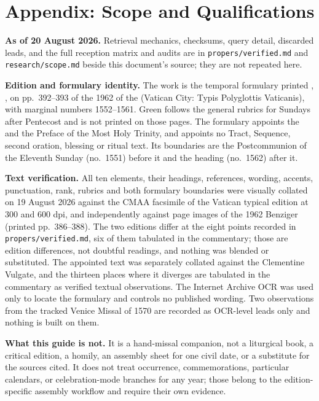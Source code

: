 \sectionguard
\section*{Appendix: Scope and Qualifications}

\textbf{As of 20 August 2026.} Retrieval mechanics, checksums, query detail,
discarded leads, and the full reception matrix and audits are in
\texttt{propers/verified.md} and \texttt{research/scope.md} beside this
document's source; they are not repeated here.

\editionnote

\textbf{Edition and formulary identity.} The work is the temporal formulary
printed , , on
pp.\ 392--393 of the 1962  of the  (Vatican City: Typis Polyglottis Vaticanis), with marginal numbers
1552--1561. Green follows the general rubrics for Sundays after Pentecost and
is not printed on those pages. The formulary appoints the  and
the Preface of the Most Holy Trinity, and appoints no Tract, Sequence, second
oration, blessing or ritual text. Its boundaries are the Postcommunion of the
Eleventh Sunday (no.\ 1551) before it and the heading  (no.\ 1562) after it.

\textbf{Text verification.} All ten elements, their headings, references,
wording, accents, punctuation, rank, rubrics and both formulary boundaries
were visually collated on 19 August 2026 against the CMAA facsimile of the
Vatican typical edition at 300 and 600 dpi, and independently against page
images of the 1962 Benziger  (printed
pp.\ 386--388). The two editions differ at the eight points recorded in
\texttt{propers/verified.md}, six of them tabulated in the commentary; those
are edition differences, not doubtful readings, and nothing was blended or
substituted. The appointed text was separately collated against the Clementine
Vulgate, and the thirteen places where it diverges are tabulated in the
commentary as verified textual observations. The Internet Archive OCR was used
only to locate the formulary and controls no published wording. Two
observations from the tracked Venice Missal of 1570 are recorded as OCR-level
leads only and nothing is built on them.

\textbf{What this guide is not.} It is a hand-missal companion, not a
liturgical book, a critical edition, a homily, an assembly sheet for one civil
date, or a substitute for the sources cited. It does not treat occurrence,
commemorations, particular calendars, or celebration-mode branches for any
year; those belong to the edition-specific assembly workflow and require their
own evidence.

